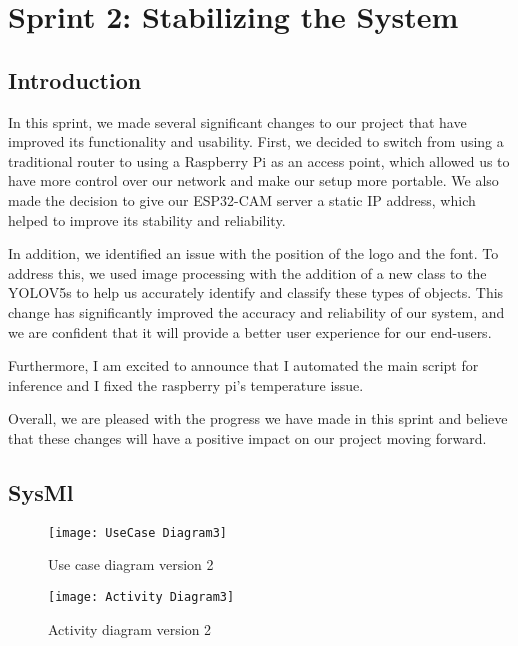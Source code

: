 %
%



\chapter{Sprint 2: Stabilizing the System}
\section{Introduction}
In this sprint, we made several significant changes to our project that have improved its functionality and usability. First, we decided to switch from using a traditional router to using a Raspberry Pi as an access point, which allowed us to have more control over our network and make our setup more portable. We also made the decision to give our ESP32-CAM server a static IP address, which helped to improve its stability and reliability.

In addition, we identified an issue with the position of the logo and the font. To address this, we used image processing with the addition of a new class to the YOLOV5s to help us accurately identify and classify these types of objects. This change has significantly improved the accuracy and reliability of our system, and we are confident that it will provide a better user experience for our end-users.

Furthermore, I am excited to announce that I automated the main script for inference and I fixed the raspberry pi's temperature issue.

Overall, we are pleased with the progress we have made in this sprint and believe that these changes will have a positive impact on our project moving forward.
\section{SysMl}

\FloatBarrier
\begin{figure}[h]

         \centering
        \texttt{[image: UseCase Diagram3]}
   
        \caption{Use case diagram version 2}
        \label{Use case diagram version 2}

    \end{figure}


\FloatBarrier
\FloatBarrier
\begin{figure}[h]
\FloatBarrier
         \centering
        \texttt{[image: Activity Diagram3]}
   
        \caption{Activity diagram version 2}
        \label{Activity diagram version 2}
\FloatBarrier
    \end{figure}


